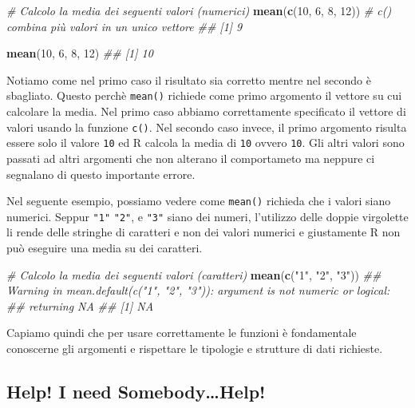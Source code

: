\documentclass[
]{book}
\newenvironment{Shaded}{\begin{snugshade}}{\end{snugshade}}
\newcommand{\CommentTok}[1]{\textcolor[rgb]{0.56,0.35,0.01}{\textit{#1}}}
\newcommand{\DecValTok}[1]{\textcolor[rgb]{0.00,0.00,0.81}{#1}}
\newcommand{\KeywordTok}[1]{\textcolor[rgb]{0.13,0.29,0.53}{\textbf{#1}}}
\newcommand{\NormalTok}[1]{#1}
\newcommand{\StringTok}[1]{\textcolor[rgb]{0.31,0.60,0.02}{#1}}
\begin{document}
\begin{Shaded}
\begin{Highlighting}[]
\CommentTok{# Calcolo la media dei seguenti valori (numerici)}
\KeywordTok{mean}\NormalTok{(}\KeywordTok{c}\NormalTok{(}\DecValTok{10}\NormalTok{, }\DecValTok{6}\NormalTok{, }\DecValTok{8}\NormalTok{, }\DecValTok{12}\NormalTok{)) }\CommentTok{# c() combina più valori in un unico vettore}
\CommentTok{## [1] 9}

\KeywordTok{mean}\NormalTok{(}\DecValTok{10}\NormalTok{, }\DecValTok{6}\NormalTok{, }\DecValTok{8}\NormalTok{, }\DecValTok{12}\NormalTok{)}
\CommentTok{## [1] 10}
\end{Highlighting}
\end{Shaded}

Notiamo come nel primo caso il risultato sia corretto mentre nel secondo è sbagliato. Questo perchè \texttt{mean()} richiede come primo argomento il vettore su cui calcolare la media. Nel primo caso abbiamo correttamente specificato il vettore di valori usando la funzione \texttt{c()}. Nel secondo caso invece, il primo argomento risulta essere solo il valore \texttt{10} ed R calcola la media di \texttt{10} ovvero \texttt{10}. Gli altri valori sono passati ad altri argomenti che non alterano il comportameto ma neppure ci segnalano di questo importante errore.

Nel seguente esempio, possiamo vedere come \texttt{mean()} richieda che i valori siano numerici. Seppur \texttt{"1"} \texttt{"2"}, e \texttt{"3"} siano dei numeri, l'utilizzo delle doppie virgolette li rende delle stringhe di caratteri e non dei valori numerici e giustamente R non può eseguire una media su dei caratteri.

\begin{Shaded}
\begin{Highlighting}[]
\CommentTok{# Calcolo la media dei seguenti valori (caratteri)}
\KeywordTok{mean}\NormalTok{(}\KeywordTok{c}\NormalTok{(}\StringTok{"1"}\NormalTok{, }\StringTok{"2"}\NormalTok{, }\StringTok{"3"}\NormalTok{))}
\CommentTok{## Warning in mean.default(c("1", "2", "3")): argument is not numeric or logical:}
\CommentTok{## returning NA}
\CommentTok{## [1] NA}
\end{Highlighting}
\end{Shaded}

Capiamo quindi che per usare correttamente le funzioni è fondamentale conoscerne gli argomenti e rispettare le tipologie e strutture di dati richieste.

\hypertarget{help}{%
\subsection{Help! I need Somebody\ldots Help!}\label{help}}
\end{document}
